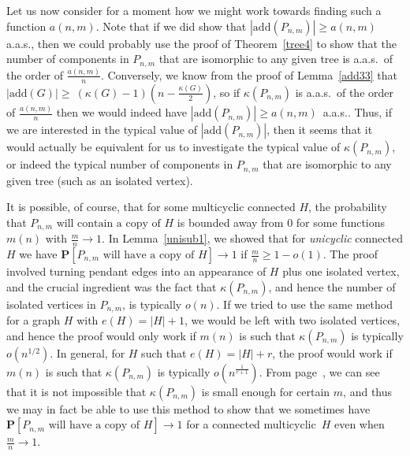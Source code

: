 \documentclass{article}
\newtheorem{Proof of Theorem}{Proof of Theorem}
\begin{document}
Let us now consider for a moment how we might work towards finding such a function $a(n,m)$.
Note that if we did show that $|\textrm{add}(P_{n,m})| \geq a(n,m)$ a.a.s.,
then we could probably use the proof of Theorem~\ref{tree4} to show that
the number of components in $P_{n,m}$ that are isomorphic to any given tree is a.a.s.~of the order of $\frac{a(n,m)}{n}$.
Conversely,
we know from the proof of Lemma~\ref{add33} that 
$|\textrm{add}(G)| \geq~\left( \kappa(G)-1 \right) \left( n-\frac{\kappa(G)}{2} \right)$,
so if $\kappa(P_{n,m})$ is a.a.s.~of the order of $\frac{a(n,m)}{n}$
then we would indeed have $|\textrm{add}(P_{n,m})| \geq a(n,m)$~a.a.s..
Thus, if we are interested in the typical value of $|\textrm{add}(P_{n,m})|$,
then it seems that it would actually be equivalent for us to investigate the typical value of $\kappa(P_{n,m})$,
or indeed the typical number of components in $P_{n,m}$
that are isomorphic to any given tree
(such as an isolated vertex). 

It is possible, of course, that for some multicyclic connected $H$,
the probability that $P_{n,m} \textrm{ will contain a copy of }H$
is bounded away from $0$ for some functions $m(n)$ with $\frac{m}{n} \to 1$.
In Lemma~\ref{unisub1},
we showed that for \textit{unicyclic} connected $H$
we have 
$\mathbf{P}[P_{n,m} \textrm{ will have a copy of }H] \to 1$
if $\frac{m}{n} \geq 1-o(1)$.
The proof involved turning pendant edges into an appearance of $H$ plus one isolated vertex,
and the crucial ingredient was the fact that $\kappa(P_{n,m})$,
and hence the number of isolated vertices in $P_{n,m}$,
is typically $o(n)$.
If we tried to use the same method for a graph $H$ with $e(H) = |H|+1$,
we would be left with two isolated vertices, 
and hence the proof would only work if $m(n)$ is such that
$\kappa(P_{n,m})$ is typically $o \left( n^{1/2} \right)$.
In general,
for $H$ such that $e(H) = |H|+r$,
the proof would work if $m(n)$ is such that $\kappa(P_{n,m})$ is typically $o \left( n^{\frac{1}{r+1}} \right)$.
From page~\pageref{cptsum},
we can see that it is not impossible that $\kappa(P_{n,m})$
is small enough for certain $m$,
and thus we may in fact be able to use this method to show that
we sometimes have
$\mathbf{P}[P_{n,m} \textrm{ will have a copy of }H] \to 1$
for a connected multicyclic~$H$ even when~$\frac{m}{n} \to 1$. 
\end{document}
